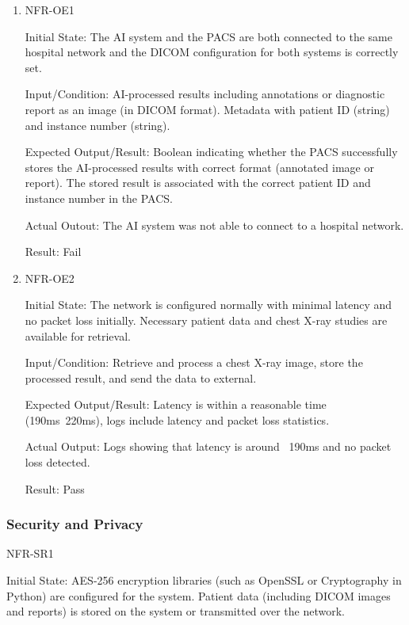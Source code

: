 \documentclass[12pt, titlepage]{article}
\begin{document}
\begin{enumerate}

  \item{NFR-OE1\\}\label{NFR-OE1}
  
  Initial State: The AI system and the PACS are both connected to the same hospital network and the DICOM configuration for both systems is correctly set.
  
  Input/Condition: AI-processed results including annotations or diagnostic report as an image (in DICOM format). Metadata with patient ID (string) and instance number (string).
  
  Expected Output/Result: Boolean indicating whether the PACS successfully stores the AI-processed results with correct format (annotated image or report). The stored result is associated with the correct patient ID and instance number in the PACS.
  
  Actual Outout: The AI system was not able to connect to a hospital network.

  Result: Fail

  \item{NFR-OE2\\}\label{NFR-OE2}

  Initial State: The network is configured normally with minimal latency and no packet loss initially. Necessary patient data and chest X-ray studies are available for retrieval.

  Input/Condition: Retrieve and process a chest X-ray image, store the processed result, and send the data to external.

  Expected Output/Result: Latency is within a reasonable time (190ms~220ms), logs include latency and packet loss statistics.

  Actual Output: Logs showing that latency is around ~190ms and no packet loss detected.

  Result: Pass

\end{enumerate}

\subsubsection{Security and Privacy}
\item{NFR-SR1\\}\label{NFR-SR1}

Initial State: AES-256 encryption libraries (such as OpenSSL or Cryptography in Python) are configured for the system. Patient data (including DICOM images and reports) is stored on the system or transmitted over the network.
\end{document}
